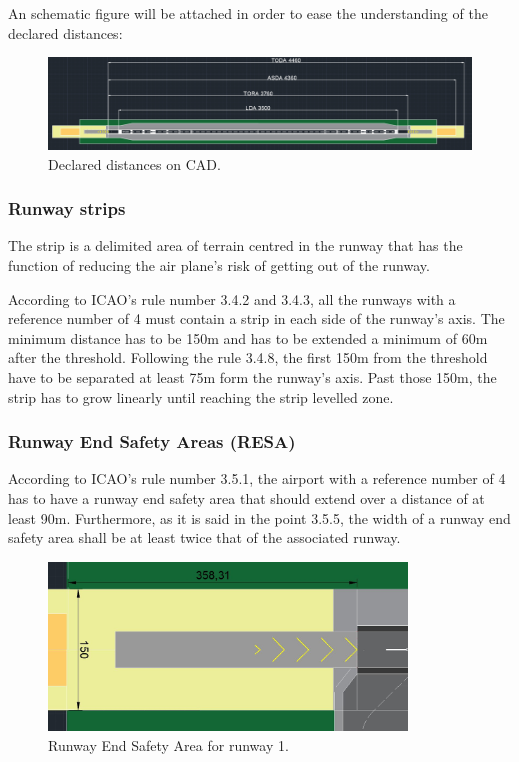 			An schematic figure will be attached in order to ease the understanding of the declared distances:
			
			\begin{figure}[H]
				\centering
				\includegraphics[clip, trim=0cm 0cm 0cm 0cm, width=1\textwidth]{./images/declareddistances/pista}
				\caption{Declared distances on CAD.} %
				\label{} %
			\end{figure}
			
			\subsubsection{Runway strips}
			The strip is a delimited area of terrain centred in the runway that has the function of reducing the air plane's risk of getting out of the runway.
			
			According to ICAO's rule number 3.4.2 and 3.4.3, all the runways with a reference number of 4 must contain a strip in each side of the runway's axis. The minimum distance has to be 150m and has to be extended a minimum of 60m after the threshold. 
			Following the rule 3.4.8, the first 150m from the threshold have to be separated at least 75m form the runway's axis. Past those 150m, the strip has to grow linearly until reaching the strip levelled zone.      
			
			\subsubsection{Runway End Safety Areas (RESA)}
			According to ICAO's rule number 3.5.1, the airport with a reference number of 4 has to have a runway end safety area that should extend over a distance of at least 90m. Furthermore, as it is said in the point 3.5.5, the width of a runway end safety area shall be at least twice that of the associated runway. 
			
			\begin{figure}[H]
				\centering
				\includegraphics[clip, trim=0cm 0cm 0cm 0cm, width=0.85\textwidth]{./images/declareddistances/RESA}
				\caption{Runway End Safety Area for runway 1.} %
				\label{} %
			\end{figure}
		
